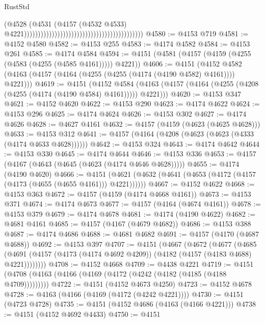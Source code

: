 \begin{lexlean}{RustStd}
\begin{coremodule}
                                                                                    (@4528
                                                                                      (@4531
                                                                                        (@4157
                                                                                          (@4532
                                                                                            @4533)
                                                                                          @4221)))))))))))))))))))))))))))))))))))))))))))
@4580 := @4153 @719
@4581 := @4152 @4580
@4582 := @4153 @255
@4583 := @4174 @4582
@4584 := @4153 @261
@4585 := @4174 @4584
@4594 := @4151 (@4581 (@4157 (@4159 (@4255 (@4583 (@4255 (@4585 @4161))))) @4221))
@4606 := @4151
    (@4152 @4582 (@4163 (@4157 (@4164 (@4255 (@4255 (@4174 (@4190 @4582) @4161)))) @4221)))
@4619 := @4151
    (@4152 @4584 (@4163 (@4157 (@4164 (@4255 (@4208 (@4255 (@4174 (@4190 @4584) @4161))))) @4221)))
@4620 := @4153 @347
@4621 := @4152 @4620
@4622 := @4153 @290
@4623 := @4174 @4622
@4624 := @4153 @296
@4625 := @4174 @4624
@4626 := @4153 @302
@4627 := @4174 @4626
@4628 := @4627 @4161
@4632 := @4157 (@4159 (@4623 (@4625 @4628)))
@4633 := @4153 @312
@4641 := @4157 (@4164 (@4208 (@4623 (@4623 (@4333 (@4174 @4633 @4628))))))
@4642 := @4153 @324
@4643 := @4174 @4642
@4644 := @4153 @330
@4645 := @4174 @4644
@4646 := @4153 @336
@4653 := @4157 (@4167 (@4643 (@4645 (@4623 (@4174 @4646 @4628)))))
@4655 := @4174 (@4190 @4620)
@4666 := @4151 (@4621 (@4632 (@4641 (@4653 (@4172 (@4157 (@4173 (@4655 (@4655 @4161))) @4221))))))
@4667 := @4152 @4622
@4668 := @4153 @363
@4672 := @4157 (@4159 (@4174 @4668 @4161))
@4673 := @4153 @371
@4674 := @4174 @4673
@4677 := @4157 (@4164 (@4674 @4161))
@4678 := @4153 @379
@4679 := @4174 @4678
@4681 := @4174 (@4190 @4622)
@4682 := @4681 @4161
@4685 := @4157 (@4167 (@4679 @4682))
@4686 := @4153 @388
@4687 := @4174 @4686
@4688 := @4681 @4682
@4691 := @4157 (@4170 (@4687 @4688))
@4692 := @4153 @397
@4707 := @4151
    (@4667
      (@4672
        (@4677
          (@4685 (@4691 (@4157 (@4173 (@4174 @4692 @4209)) (@4182 (@4157 (@4183 @4688) @4221))))))))
@4708 := @4152 @4668
@4709 := @4438 @4221
@4719 := @4151 (@4708 (@4163 (@4166 (@4169 (@4172 (@4242 (@4182 (@4185 (@4188 @4709)))))))))
@4722 := @4151 (@4152 @4673 @4250)
@4723 := @4152 @4678
@4728 := @4163 (@4166 (@4169 (@4172 (@4242 @4221))))
@4730 := @4151 (@4723 @4728)
@4735 := @4151 (@4152 @4686 (@4163 (@4166 @4221)))
@4738 := @4151 (@4152 @4692 @4433)
@4750 := @4151

\end{coremodule}
\end{lexlean}
